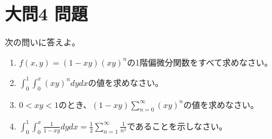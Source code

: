 \documentclass[dvipdfmx]{jsreport}
\begin{document}
\section{大問4 問題}
\begin{tcolorbox} %
	次の問いに答えよ。
\begin{enumerate}
	\item $f(x, y)= (1- xy)(xy)^n$の1階偏微分関数をすべて求めなさい。
	\item $\int_0^1\int_0^x (xy)^n dydx$の値を求めなさい。
	\item $0< xy< 1$のとき、$(1- xy)\sum_{n= 0}^\infty (xy)^n$の値を求めなさい。
	\item $\int_0^1\int_0^x \frac{1}{1- xy}dydx= \frac{1}{2}\sum_{n= 1}^\infty \frac{1}{n^2}$であることを示しなさい。
\end{enumerate}
\end{tcolorbox}
\end{document}
